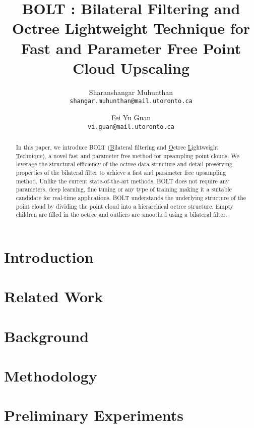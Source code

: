 \documentclass[fleqn, twocolumn]{article}
\author{
	Sharanshangar Muhunthan \\ \texttt{shangar.muhunthan@mail.utoronto.ca}
	\and
	Fei Yu Guan \\ \texttt{vi.guan@mail.utoronto.ca}
}
\title{BOLT \emoji{high-voltage}: Bilateral Filtering and Octree Lightweight Technique for Fast and Parameter Free Point Cloud Upscaling}
\begin{document}
\maketitle
\begin{abstract}
	In this paper, we introduce BOLT (\underline{B}ilateral filtering and \underline{O}ctree \underline{L}ightweight \underline{T}echnique), a novel fast and parameter free method for upsampling point clouds.
	We leverage the structural efficiency of the octree data structure and detail preserving properties of the bilateral filter to achieve a fast and parameter free upsampling method.
	Unlike the current state-of-the-art methods, BOLT does not require any parameters, deep learning, fine tuning or any type of training making it a suitable candidate for real-time applications.
	BOLT understands the underlying structure of the point cloud by dividing the point cloud into a hierarchical octree structure. 
	Empty children are filled in the octree and outliers are smoothed using a bilateral filter.
\end{abstract}

\section{Introduction}



\section{Related Work}



\section{Background}



\section{Methodology}



\section{Preliminary Experiments}



%
%
\pagebreak


\end{document}
